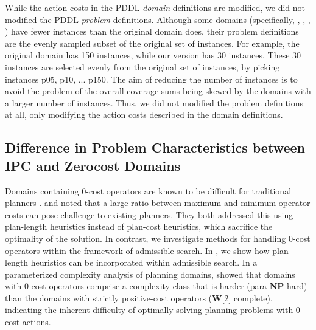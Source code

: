 While the action costs in the PDDL \emph{domain} definitions are modified,
we did not modified the PDDL \emph{problem} definitions.
Although some domains (specifically, , , , ) have fewer instances than the original domain does,
their problem definitions are the evenly sampled subset of the original set of instances.
For example, the original  domain has 150 instances, while our version has 30 instances.
These 30 instances are selected evenly from the original set of instances, by picking instances p05, p10, ... p150.
% 
The aim of reducing the number of instances is to avoid the problem of the overall coverage sums being skewed by the domains with a larger number of instances.
Thus, we did not modified the problem definitions at all, only modifying the action costs described in the domain definitions.

\subsection{Difference in Problem Characteristics between IPC and Zerocost Domains}

Domains containing 0-cost operators are known to be difficult for traditional planners \cite{thayer2009using,cushing2010cost,wilt2011cost,thayer2011bounded,richter2011lama}.
\citeauthor{cushing2010cost} \citeyear{cushing2010cost} and \citeauthor{wilt2011cost} \citeyear{wilt2011cost} noted that a large ratio between maximum and minimum operator costs can pose challenge to existing planners. They both addressed this using plan-length heuristics instead of plan-cost heuristics, which sacrifice the optimality of the solution. In contrast, we investigate methods for handling 0-cost operators within the framework of admissible search. In , we show how  plan length heuristics can be incorporated within admissible search.
In a parameterized complexity analysis of planning domains,
\citeauthor{aghighi2015} \citeyear{aghighi2015,aghighi2016} %
showed %
that domains with 0-cost operators comprise a complexity class that is harder (para-\textbf{NP}-hard) than the domains with strictly positive-cost operators (\textbf{W}[2] complete), 
indicating the inherent difficulty of optimally solving planning problems with 0-cost actions.

